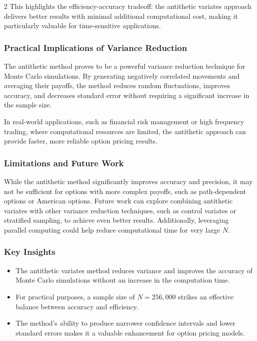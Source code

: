 \begin{multicols}{2}
This highlights the efficiency-accuracy tradeoff: the antithetic variates approach delivers better results with minimal additional computational cost, making it particularly valuable for time-sensitive applications.
\subsubsection*{Practical Implications of Variance Reduction}
The antithetic method proves to be a powerful variance reduction technique for Monte Carlo simulations. By generating negatively correlated movements and averaging their payoffs, the method reduces random fluctuations, improves accuracy, and decreases standard error without requiring a significant increase in the sample size.

In real-world applications, such as financial risk management or high frequency trading, where computational resources are limited, the antithetic approach can provide faster, more reliable option pricing results.
\subsubsection*{Limitations and Future Work}
While the antithetic method significantly improves accuracy and precision, it may not be sufficient for options with more complex payoffs, such as path-dependent options or American options. Future work can explore combining antithetic variates with other variance reduction techniques, such as control variates or stratified sampling, to achieve even better results. Additionally, leveraging parallel computing could help reduce computational time for very large \(N\).
\subsubsection{Key Insights}
\begin{itemize}
    \item The antithetic variates method reduces variance and improves the accuracy of Monte Carlo simulations without an increase in the computation time.
    \item For practical purposes, a sample size of \(N = 256,000\) strikes an effective balance between accuracy and efficiency.
    \item The method’s ability to produce narrower confidence intervals and lower standard errors makes it a valuable enhancement for option pricing models.
\end{itemize}

\end{multicols}
